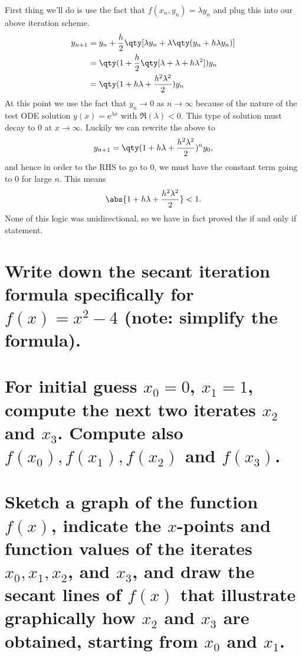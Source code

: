\documentclass[boxes,pages]{homework}
\newcommand{\e}{\mathrm{e}}
\begin{document}
\begin{solution}
	First thing we'll do is use the fact that $f(x_n, y_n) = \lambda y_n$ and plug this into our above iteration scheme.
	\begin{align*}
		y_{n+1} & = y_n + \frac{h}{2}\qty[\lambda y_n + \lambda\qty(y_n + h\lambda y_n)] \\
		        & = \qty(1 + \frac{h}{2}\qty[\lambda + \lambda + h\lambda^2])y_n         \\
		        & = \qty(1 + h\lambda + \frac{h^2\lambda^2}{2})y_n
	\end{align*}
	At this point we use the fact that $y_n\to 0$ as $n\to\infty$ because of the nature of the test ODE solution $y(x) = \e^{\lambda x}$ with $\Re(\lambda) < 0$. This type of solution must decay to 0 at $x\to\infty$. Luckily we can rewrite the above to
	\begin{equation*}
		y_{n+1} = \qty(1 + h\lambda + \frac{h^2\lambda^2}{2})^ny_0,
	\end{equation*}
	and hence in order to the RHS to go to 0, we must have the constant term going to 0 for large $n$. This means
	\begin{equation*}
		\abs{1 + h\lambda + \frac{h^2\lambda^2}{2}} < 1.
	\end{equation*}
	None of this logic was unidirectional, so we have in fact proved the if and only if statement.
\end{solution}

\begin{problem}
\begin{parts}
	\part{Write down the secant iteration formula specifically for $f(x) = x^2 - 4$ (note: simplify the formula).}\label{part:10a}
	\part{For initial guess $x_0 = 0$, $x_1 = 1$, compute the next two iterates $x_2$ and $x_3$. Compute also $f(x_0), f(x_1), f(x_2)$ and $f(x_3)$.}\label{part:10b}
	\part{Sketch a graph of the function $f(x)$, indicate the $x$-points and function values of the iterates $x_0, x_1, x_2$, and $x_3$, and draw the secant lines of $f(x)$ that illustrate graphically how $x_2$ and $x_3$ are obtained, starting from $x_0$ and $x_1$.}\label{part:10c}
\end{parts}
\end{problem}
\end{document}
